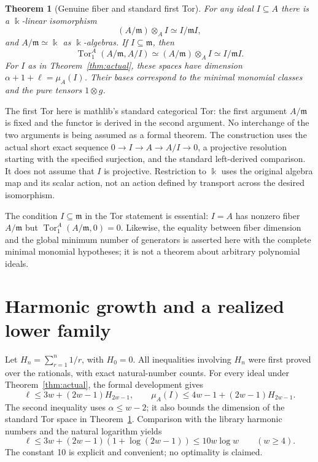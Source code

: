 \documentclass[11pt,a4paper]{article}
\newtheorem{theorem}{Theorem}[section]
\newcommand{\kk}{\Bbbk}
\begin{document}
\begin{theorem}[Genuine fiber and standard first Tor]\label{thm:tor}
For any ideal $I\subseteq A$ there is a $\kk$-linear isomorphism
\[
 (A/\mathfrak m)\otimes_A I\simeq I/\mathfrak mI,
\]
and $A/\mathfrak m\simeq\kk$ as $\kk$-algebras. If $I\subseteq\mathfrak m$, then
\[
 \operatorname{Tor}_1^A(A/\mathfrak m,A/I)
 \simeq (A/\mathfrak m)\otimes_A I\simeq I/\mathfrak mI.
\]
For $I$ as in Theorem~\ref{thm:actual}, these spaces have dimension
$\alpha+1+\ell=\mu_A(I)$. Their bases correspond to the minimal monomial
classes and the pure tensors $1\otimes g$.
\end{theorem}

The first Tor here is mathlib's standard categorical Tor: the first argument
$A/\mathfrak m$ is fixed and the functor is derived in the second argument.
No interchange of the two arguments is being assumed as a formal theorem.
The construction uses the actual short exact sequence
$0\to I\to A\to A/I\to0$, a projective resolution starting with the specified
surjection, and the standard left-derived comparison. It does not assume that
$I$ is projective. Restriction to $\kk$ uses the original algebra map and its
scalar action, not an action defined by transport across the desired isomorphism.

The condition $I\subseteq\mathfrak m$ in the Tor statement is essential:
$I=A$ has nonzero fiber $A/\mathfrak m$ but
$\operatorname{Tor}_1^A(A/\mathfrak m,0)=0$.
Likewise, the equality between fiber dimension and the global minimum number
of generators is asserted here with the complete minimal monomial hypotheses;
it is not a theorem about arbitrary polynomial ideals.

\section{Harmonic growth and a realized lower family}\label{sec:log}
Let $H_n=\sum_{r=1}^{n}1/r$, with $H_0=0$. All inequalities involving
$H_n$ were first proved over the rationals, with exact natural-number counts.
For every ideal under Theorem~\ref{thm:actual}, the formal development gives
\begin{equation}\label{eq:harmonic}
 \ell\le3w+(2w-1)H_{2w-1},\qquad
 \mu_A(I)\le4w-1+(2w-1)H_{2w-1}.
\end{equation}
The second inequality uses $\alpha\le w-2$; it also bounds the dimension of the
standard Tor space in Theorem~\ref{thm:tor}. Comparison with the library harmonic
numbers and the natural logarithm yields
\begin{equation}\label{eq:logupper}
 \ell\le 3w+(2w-1)(1+\log(2w-1))\le10w\log w
 \qquad(w\ge4).
\end{equation}
The constant 10 is explicit and convenient; no optimality is claimed.
\end{document}
